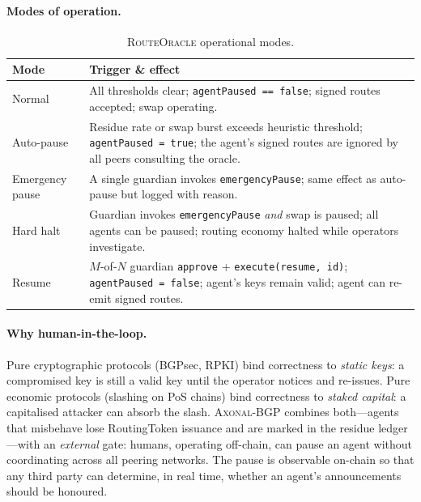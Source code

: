 \documentclass[11pt,twocolumn]{article}
\theoremstyle{definition}
\theoremstyle{plain}
\theoremstyle{remark}
\newcommand{\axonal}{\textsc{Axonal-BGP}}
\newcommand{\contractname}[1]{\textsc{#1}}
\newcommand{\code}[1]{\texttt{#1}}
\begin{document}
\paragraph{Modes of operation.}

\begin{table}[H]
\centering
\caption{\contractname{RouteOracle} operational modes.}
\label{tab:modes}
\small
\begin{tabular}{@{}p{2.4cm}p{5.2cm}@{}}
\toprule
\textbf{Mode} & \textbf{Trigger \& effect} \\
\midrule
Normal & All thresholds clear; \code{agentPaused == false}; signed routes accepted; swap operating. \\
\midrule
Auto-pause & Residue rate or swap burst exceeds heuristic threshold; \code{agentPaused = true}; the agent's signed routes are ignored by all peers consulting the oracle. \\
\midrule
Emergency pause & A single guardian invokes \code{emergencyPause}; same effect as auto-pause but logged with reason. \\
\midrule
Hard halt & Guardian invokes \code{emergencyPause} \emph{and} swap is paused; all agents can be paused; routing economy halted while operators investigate. \\
\midrule
Resume & $M$-of-$N$ guardian \code{approve} + \code{execute(resume, id)}; \code{agentPaused = false}; agent's keys remain valid; agent can re-emit signed routes. \\
\bottomrule
\end{tabular}
\end{table}

\paragraph{Why human-in-the-loop.} Pure cryptographic protocols (BGPsec, RPKI) bind correctness to \emph{static keys}: a compromised key is still a valid key until the operator notices and re-issues. Pure economic protocols (slashing on PoS chains) bind correctness to \emph{staked capital}: a capitalised attacker can absorb the slash. \axonal{} combines both---agents that misbehave lose RoutingToken issuance and are marked in the residue ledger---with an \emph{external} gate: humans, operating off-chain, can pause an agent without coordinating across all peering networks. The pause is observable on-chain so that any third party can determine, in real time, whether an agent's announcements should be honoured.
\end{document}
